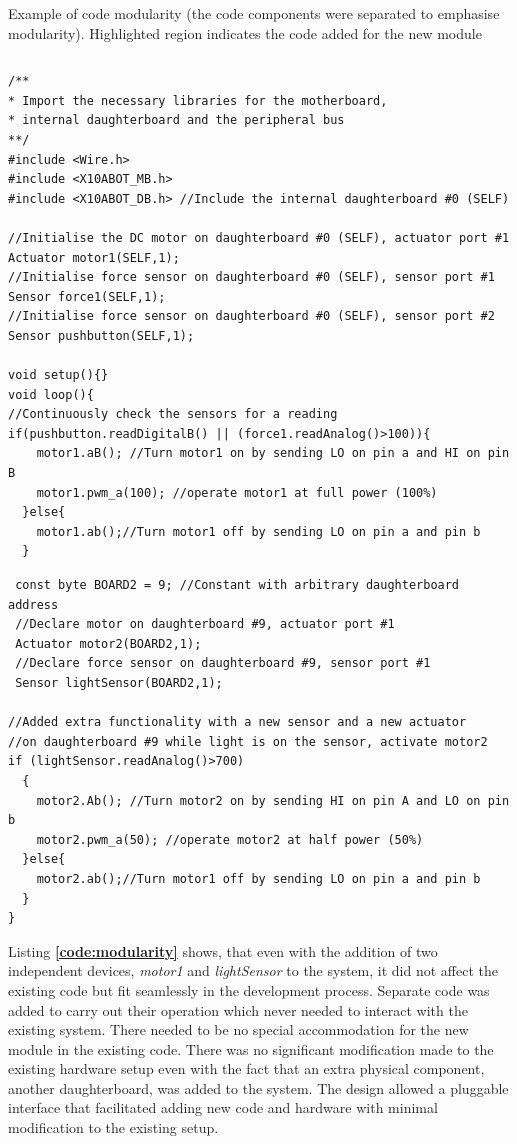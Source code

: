\begin{listing}
		\footnotesize
        {\fontsize{8}{6}\selectfont
		\caption{Example of code modularity (the code components were separated to emphasise modularity). Highlighted region indicates the code added for the new module} \label{code:modularity}
		\begin{verbatim}
        \end{verbatim}
        \begin{verbatim}
/**
* Import the necessary libraries for the motherboard, 
* internal daughterboard and the peripheral bus
**/
#include <Wire.h>  
#include <X10ABOT_MB.h>
#include <X10ABOT_DB.h> //Include the internal daughterboard #0 (SELF)

//Initialise the DC motor on daughterboard #0 (SELF), actuator port #1
Actuator motor1(SELF,1);
//Initialise force sensor on daughterboard #0 (SELF), sensor port #1
Sensor force1(SELF,1);
//Initialise force sensor on daughterboard #0 (SELF), sensor port #2
Sensor pushbutton(SELF,1);
   
void setup(){}
void loop(){
//Continuously check the sensors for a reading
if(pushbutton.readDigitalB() || (force1.readAnalog()>100)){
    motor1.aB(); //Turn motor1 on by sending LO on pin a and HI on pin B
    motor1.pwm_a(100); //operate motor1 at full power (100%) 
  }else{
    motor1.ab();//Turn motor1 off by sending LO on pin a and pin b
  }
 \end{verbatim}
 \begin{verbatim}
 const byte BOARD2 = 9; //Constant with arbitrary daughterboard address
 //Declare motor on daughterboard #9, actuator port #1
 Actuator motor2(BOARD2,1);
 //Declare force sensor on daughterboard #9, sensor port #1
 Sensor lightSensor(BOARD2,1);
 
//Added extra functionality with a new sensor and a new actuator
//on daughterboard #9 while light is on the sensor, activate motor2
if (lightSensor.readAnalog()>700)
  {
    motor2.Ab(); //Turn motor2 on by sending HI on pin A and LO on pin b
    motor2.pwm_a(50); //operate motor2 at half power (50%)
  }else{
    motor2.ab();//Turn motor1 off by sending LO on pin a and pin b
  }
}	 
	\end{verbatim}
		}
\end{listing}
Listing \textbf{\ref{code:modularity}} shows, that even with the addition of two independent devices, \emph{motor1} and \emph{lightSensor} to the system, it did not affect the existing code but fit seamlessly in the development process. Separate code was added to carry out their operation which never needed to interact with the existing system. There needed to be no special accommodation for the new module in the existing code. There was no significant modification made to the existing hardware setup even with the fact that an extra physical component, another daughterboard, was added to the system. The \xten design allowed a pluggable interface that facilitated adding new code and hardware with minimal modification to the existing setup.
